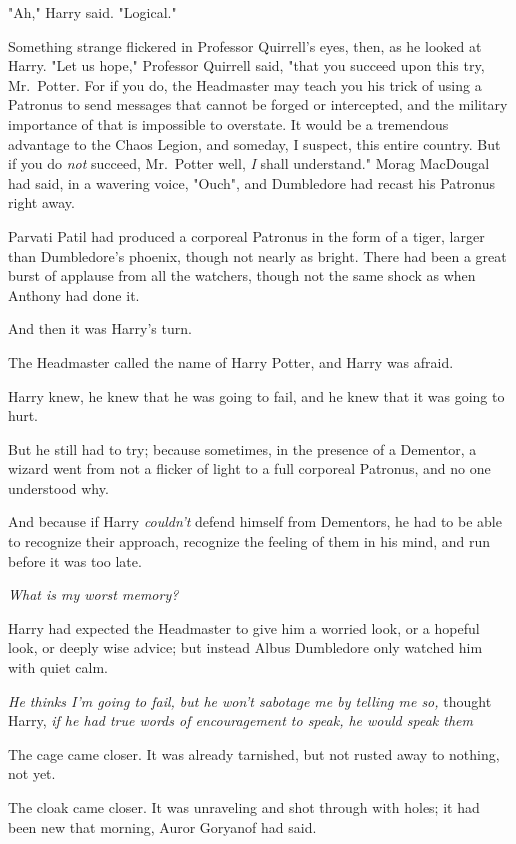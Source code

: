 "Ah," Harry said. "Logical."

Something strange flickered in Professor Quirrell's eyes, then, as he looked at
Harry. "Let us hope," Professor Quirrell said, "that you succeed upon this try,
Mr.~Potter. For if you do, the Headmaster may teach you his trick of using a
Patronus to send messages that cannot be forged or intercepted, and the
military importance of that is impossible to overstate. It would be a
tremendous advantage to the Chaos Legion, and someday, I suspect, this entire
country. But if you do \emph{not} succeed, Mr.~Potter{\el} well, \emph{I}
shall understand."
\sbreak
Morag MacDougal had said, in a wavering voice, "Ouch", and Dumbledore had
recast his Patronus right away.

Parvati Patil had produced a corporeal Patronus in the form of a tiger, larger
than Dumbledore's phoenix, though not nearly as bright. There had been a great
burst of applause from all the watchers, though not the same shock as when
Anthony had done it.

And then it was Harry's turn.

The Headmaster called the name of Harry Potter, and Harry was afraid.

Harry knew, he knew that he was going to fail, and he knew that it was going to
hurt.

But he still had to try; because sometimes, in the presence of a Dementor, a
wizard went from not a flicker of light to a full corporeal Patronus, and no
one understood why.

And because if Harry \emph{couldn't} defend himself from Dementors, he had to
be able to recognize their approach, recognize the feeling of them in his mind,
and run before it was too late.

\emph{What is my worst memory\el?}

Harry had expected the Headmaster to give him a worried look, or a hopeful
look, or deeply wise advice; but instead Albus Dumbledore only watched him with
quiet calm.

\emph{He thinks I'm going to fail, but he won't sabotage me by telling me so,}
thought Harry, \emph{if he had true words of encouragement to speak, he would
speak them{\el}}

The cage came closer. It was already tarnished, but not rusted away to nothing,
not yet.

The cloak came closer. It was unraveling and shot through with holes;
it had been new that morning, Auror Goryanof had said.

